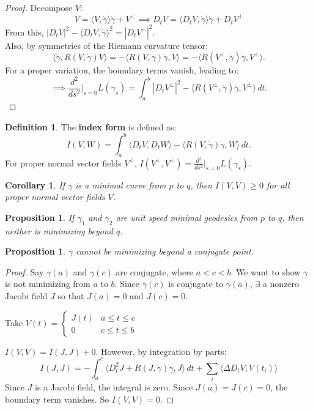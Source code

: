 \documentclass[11pt, a4paper]{article}
\theoremstyle{plain}
\newtheorem{proposition}[theorem]{Proposition}
\newtheorem{corollary}[theorem]{Corollary}
\theoremstyle{definition}
\newtheorem{definition}[theorem]{Definition}
\theoremstyle{remark}
\begin{document}
{\begin{proof}
Decompose $V$:
\[ V = \langle V, \dot{\gamma} \rangle \dot{\gamma} + V^\perp \implies D_t V = \langle D_t V, \dot{\gamma} \rangle \dot{\gamma} + D_t V^\perp \]
From this, $ |D_t V|^2 - \langle D_t V, \dot{\gamma} \rangle^2 = |D_t V^\perp|^2 $. \\
Also, by symmetries of the Riemann curvature tensor:
\[ \langle \dot{\gamma}, R(V, \dot{\gamma})V \rangle = - \langle R(V, \dot{\gamma})\dot{\gamma}, V \rangle = - \langle R(V^\perp, \dot{\gamma})\dot{\gamma}, V^\perp \rangle. \]
For a proper variation, the boundary terms vanish, leading to:
\[
\implies \frac{d^2}{ds^2}\bigg|_{s=0} L(\gamma_s) = \int_a^b |D_t V^\perp|^2 - \langle R(V^\perp, \dot{\gamma})\dot{\gamma}, V^\perp \rangle \, dt.
\]
\end{proof}

\begin{definition}
The \textbf{index form} is defined as:
\[
I(V, W) = \int_a^b \langle D_t V, D_t W \rangle - \langle R(V, \dot{\gamma})\dot{\gamma}, W \rangle \, dt.
\]
For proper normal vector fields $V^\perp$, $I(V^\perp, V^\perp) = \frac{d^2}{ds^2}\Big|_{s=0} L(\gamma_s)$.
\end{definition}

\begin{corollary}
If $\gamma$ is a minimal curve from $p$ to $q$, then $I(V, V) \ge 0$ for all proper normal vector fields $V$.
\end{corollary}

\begin{proposition}
If $\gamma_1$ and $\gamma_2$ are unit speed minimal geodesics from $p$ to $q$, then neither is minimizing beyond $q$.
\end{proposition}

\begin{proposition}
$\gamma$ cannot be minimizing beyond a conjugate point.
\end{proposition}

\begin{proof}
Say $\gamma(a)$ and $\gamma(c)$ are conjugate, where $a < c < b$. We want to show $\gamma$ is not minimizing from $a$ to $b$. 
Since $\gamma(c)$ is conjugate to $\gamma(a)$, $\exists$ a nonzero Jacobi field $J$ so that $J(a) = 0$ and $J(c) = 0$.

Take $V(t) = 
\begin{cases} 
J(t) & a \le t \le c \\ 
0 & c \le t \le b 
\end{cases}$

$I(V, V) = I(J, J) + 0$. However, by integration by parts:
\[
I(J, J) = -\int_a^c \langle D_t^2 J + R(J, \dot{\gamma})\dot{\gamma}, J \rangle \, dt + \sum_{i} \langle \Delta D_t V, V(t_i) \rangle
\]
Since $J$ is a Jacobi field, the integral is zero. Since $J(a) = J(c) = 0$, the boundary term vanishes. So $I(V, V) = 0$.


\end{proof}}
\end{document}

